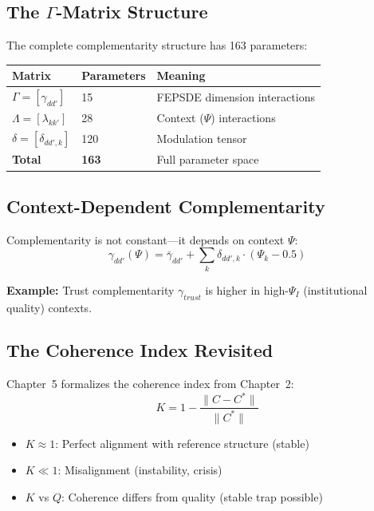 \subsection{The $\Gamma$-Matrix Structure}

The complete complementarity structure has 163 parameters:

\begin{center}
\renewcommand{\arraystretch}{1.2}
\begin{tabular}{lll}
\toprule
\textbf{Matrix} & \textbf{Parameters} & \textbf{Meaning} \\
\midrule
$\Gamma = [\gamma_{dd'}]$ & 15 & FEPSDE dimension interactions \\
$\Lambda = [\lambda_{kk'}]$ & 28 & Context ($\Psi$) interactions \\
$\delta = [\delta_{dd',k}]$ & 120 & Modulation tensor \\
\midrule
\textbf{Total} & \textbf{163} & Full parameter space \\
\bottomrule
\end{tabular}
\end{center}

\subsection{Context-Dependent Complementarity}

Complementarity is not constant---it depends on context $\Psi$:
\begin{equation}
\boxed{
\gamma_{dd'}(\Psi) = \bar{\gamma}_{dd'} + \sum_k \delta_{dd',k} \cdot (\Psi_k - 0.5)
}
\label{eq:mp-gamma-context}
\end{equation}

\textbf{Example:} Trust complementarity $\gamma_{trust}$ is higher in high-$\Psi_I$ (institutional quality) contexts.

\subsection{The Coherence Index Revisited}

Chapter~5 formalizes the coherence index from Chapter~2:
\begin{equation}
K = 1 - \frac{\|C - C^*\|}{\|C^*\|}
\label{eq:mp-coherence-ch5}
\end{equation}

\begin{itemize}
\item $K \approx 1$: Perfect alignment with reference structure (stable)
\item $K \ll 1$: Misalignment (instability, crisis)
\item $K$ vs $Q$: Coherence differs from quality (stable trap possible)
\end{itemize}

